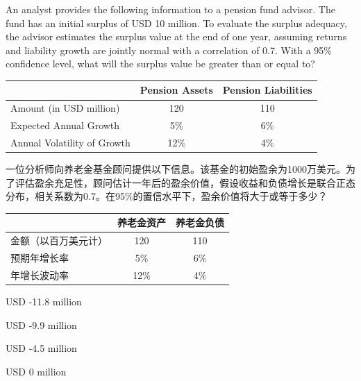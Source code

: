 \documentclass{article}
\newcounter{question} %
\begin{document}
\begin{question}
    An analyst provides the following information to a pension fund advisor. The fund has an initial surplus of USD 10 million. To evaluate the surplus adequacy, the advisor estimates the surplus value at the end of one year, assuming returns and liability growth are jointly normal with a correlation of 0.7. With a 95\% confidence level, what will the surplus value be greater than or equal to?
    
    \begin{table}[H]
        \centering
        \renewcommand{\arraystretch}{1.2}
        \begin{tabular}{|l|c|c|}
            \hline
            & \textbf{Pension Assets} & \textbf{Pension Liabilities} \\
            \hline
            Amount (in USD million)     & 120             & 110                 \\
            Expected Annual Growth      & 5\%             & 6\%                 \\
            Annual Volatility of Growth & 12\%            & 4\%                 \\
            \hline
        \end{tabular}
    \end{table}
    一位分析师向养老金基金顾问提供以下信息。该基金的初始盈余为1000万美元。为了评估盈余充足性，顾问估计一年后的盈余价值，假设收益和负债增长是联合正态分布，相关系数为0.7。在95\%的置信水平下，盈余价值将大于或等于多少？
    \begin{table}[htbp]
        \centering
        \renewcommand{\arraystretch}{1.2}
        \begin{tabular}{|l|c|c|}
            \hline
            & \textbf{养老金资产} & \textbf{养老金负债} \\
            \hline
            金额（以百万美元计）     & 120             & 110                 \\
            预期年增长率      & 5\%             & 6\%                 \\
            年增长波动率 & 12\%            & 4\%                 \\
            \hline
        \end{tabular}
    \end{table}
\end{question}

\begin{choices}
    \item USD -11.8 million
    \item USD -9.9 million
    \item USD -4.5 million
    \item USD 0 million
\end{choices}
\end{document}
